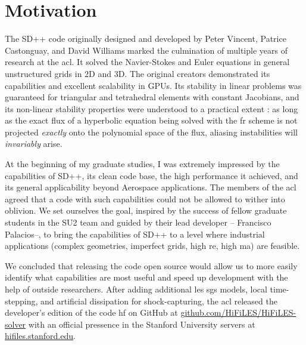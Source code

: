 \section{Motivation}
The SD++ code originally designed and developed by Peter Vincent, Patrice Castonguay, and David Williams \cite{castonguay2011} marked the culmination of multiple years of research at the \gls{acl}. It solved the Navier-Stokes and Euler equations in general unstructured grids in 2D and 3D. The original creators demonstrated its capabilities and excellent scalability in GPUs. Its stability in linear problems was guaranteed for triangular \cite{williams2013tri} and tetrahedral \cite{williams2013tet} elements with constant Jacobians, and its non-linear stability properties were understood to a practical extent \cite{jameson2012non}: as long as the exact flux of a hyperbolic equation being solved with the \gls{fr} scheme is not projected \emph{exactly} onto the polynomial space of the flux, aliasing instabilities will \emph{invariably} arise.

At the beginning of my graduate studies, I was extremely impressed by the capabilities of SD++, its clean code base, the high performance it achieved, and its general applicability beyond Aerospace applications. The members of the \gls{acl} agreed that a code with such capabilities could not be allowed to wither into oblivion. We set ourselves the goal, inspired by the success of fellow graduate students in the SU2 \cite{palacios2013stanford} team and guided by their lead developer -- Francisco Palacios--, to bring the capabilities of SD++ to a level where industrial applications (complex geometries, imperfect grids, high \gls{re}, high \gls{ma}) are feasible.

We concluded that releasing the code open source would allow us to more easily identify what capabilities are most useful and speed up development with the help of outside researchers. After adding additional \gls{les} \gls{sgs} models, local time-stepping, and artificial dissipation for shock-capturing, the \gls{acl} released the developer's edition of the code \gls{hf} on GitHub at \url{github.com/HiFiLES/HiFiLES-solver} with an official pressence in the Stanford University servers at \url{hifiles.stanford.edu}.

